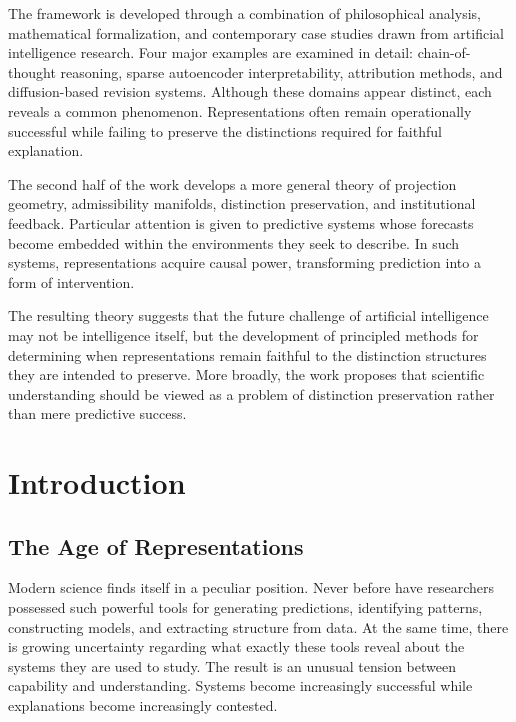 \documentclass[11pt,oneside,openany]{book}
\begin{document}
The framework is developed through a combination of philosophical analysis, mathematical formalization, and contemporary case studies drawn from artificial intelligence research. Four major examples are examined in detail: chain-of-thought reasoning, sparse autoencoder interpretability, attribution methods, and diffusion-based revision systems. Although these domains appear distinct, each reveals a common phenomenon. Representations often remain operationally successful while failing to preserve the distinctions required for faithful explanation.

The second half of the work develops a more general theory of projection geometry, admissibility manifolds, distinction preservation, and institutional feedback. Particular attention is given to predictive systems whose forecasts become embedded within the environments they seek to describe. In such systems, representations acquire causal power, transforming prediction into a form of intervention.

The resulting theory suggests that the future challenge of artificial intelligence may not be intelligence itself, but the development of principled methods for determining when representations remain faithful to the distinction structures they are intended to preserve. More broadly, the work proposes that scientific understanding should be viewed as a problem of distinction preservation rather than mere predictive success.

\newpage

\tableofcontents

\mainmatter

\chapter{Introduction}

\section{The Age of Representations}

Modern science finds itself in a peculiar position. Never before have researchers possessed such powerful tools for generating predictions, identifying patterns, constructing models, and extracting structure from data. At the same time, there is growing uncertainty regarding what exactly these tools reveal about the systems they are used to study. The result is an unusual tension between capability and understanding. Systems become increasingly successful while explanations become increasingly contested.
\end{document}
